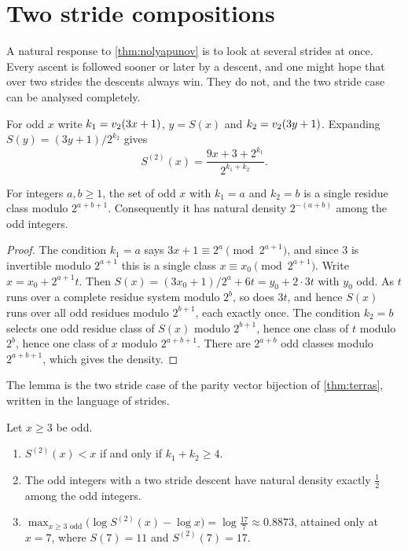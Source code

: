 \section{Two stride compositions}\label{sec:ch4:twostride}

A natural response to \cref{thm:nolyapunov} is to look at several strides at
once.  Every ascent is followed sooner or later by a descent, and one might
hope that over two strides the descents always win.  They do not, and the
two stride case can be analysed completely.

For odd $x$ write $k_1=v_2(3x+1)$, $y=S(x)$ and $k_2=v_2(3y+1)$.  Expanding
$S(y)=(3y+1)/2^{k_2}$ gives
\begin{equation}\label{eq:ch4:twostride}
  S^{(2)}(x)=\frac{9x+3+2^{k_1}}{2^{k_1+k_2}} .
\end{equation}

\begin{lemma}\label{lem:ch4:tworesidue}
For integers $a,b\ge1$, the set of odd $x$ with $k_1=a$ and $k_2=b$ is a
single residue class modulo $2^{a+b+1}$.  Consequently it has natural density
$2^{-(a+b)}$ among the odd integers.
\end{lemma}

\begin{proof}
The condition $k_1=a$ says $3x+1\equiv2^a\pmod{2^{a+1}}$, and since $3$ is
invertible modulo $2^{a+1}$ this is a single class $x\equiv x_0\pmod{2^{a+1}}$.
Write $x=x_0+2^{a+1}t$.  Then $S(x)=(3x_0+1)/2^a+6t=y_0+2\cdot3t$ with $y_0$
odd.  As $t$ runs over a complete residue system modulo $2^{b}$, so does $3t$,
and hence $S(x)$ runs over all odd residues modulo $2^{b+1}$, each exactly once.
The condition $k_2=b$ selects one odd residue class of $S(x)$ modulo $2^{b+1}$,
hence one class of $t$ modulo $2^b$, hence one class of $x$ modulo $2^{a+b+1}$.
There are $2^{a+b}$ odd classes modulo $2^{a+b+1}$, which gives the density.
\end{proof}

The lemma is the two stride case of the parity vector bijection of
\cref{thm:terras}, written in the language of strides.

\begin{proposition}\label{prop:ch4:twostride}
Let $x\ge3$ be odd.
\begin{enumerate}[label=(\roman*)]
\item $S^{(2)}(x)<x$ if and only if $k_1+k_2\ge4$.
\item The odd integers with a two stride descent have natural density exactly
  $\tfrac12$ among the odd integers.
\item $\displaystyle\max_{x\ge3\text{ odd}}\bigl(\log S^{(2)}(x)-\log x\bigr)
  =\log\frac{17}{7}\approx0.8873$, attained only at $x=7$, where
  $S(7)=11$ and $S^{(2)}(7)=17$.
\end{enumerate}
\end{proposition}

